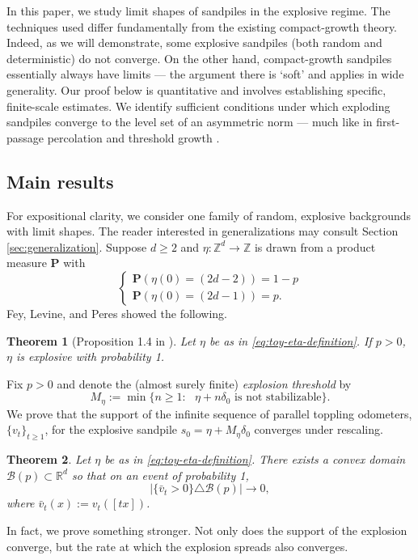 \documentclass[aap]{imsart}
\newcommand{\R}{\mathbb{R}}
\newcommand{\Z}{\mathbb{Z}}
\newtheorem{theorem}{Theorem}[section]
\begin{document}
In this paper, we study limit shapes of sandpiles in the explosive regime. The techniques used differ fundamentally from the existing compact-growth theory. Indeed, as we will demonstrate, some explosive sandpiles (both random and deterministic) do not converge. On the other hand, compact-growth sandpiles essentially always have limits --- the argument there is `soft' and applies in wide generality. Our proof below is quantitative and involves establishing specific, finite-scale estimates. We identify sufficient conditions under which exploding sandpiles converge to the level set of an asymmetric norm  --- much like in first-passage percolation  \cite{cox1981some} and threshold growth \cite{willson1978convergence, gravner1993threshold}.


\subsection{Main results}	
For expositional clarity, we consider one family of random, explosive backgrounds with limit shapes. The reader interested in generalizations may consult Section \ref{sec:generalization}. Suppose $d \geq 2$ and $\eta:\Z^d \to \Z$ is drawn from a product measure $\mathbf{P}$ with
\begin{equation} \label{eq:toy-eta-definition}
\begin{cases}
\mathbf{P}(\eta(0) = (2 d - 2)) = 1-p \\
\mathbf{P}(\eta(0) = (2 d - 1)) = p.
\end{cases}
\end{equation}
Fey, Levine, and Peres showed the following.
\begin{theorem}[Proposition 1.4 in \cite{fey2010growth}]\label{prop:fey_levine_peres_explode}
	Let $\eta$ be as in \eqref{eq:toy-eta-definition}.  If $p > 0$, $\eta$ is explosive with probability 1. 
\end{theorem}
Fix $p > 0$ and denote the (almost surely finite) {\it explosion threshold} by
\begin{equation} \label{eq:first_explosion}
M_{\eta} :=  \min\{ n \geq 1 : \mbox{ $\eta + n  \delta_0$ is not stabilizable} \}. 
\end{equation} 
We prove that the support of the infinite sequence of parallel toppling odometers, $\{v_t\}_{t \geq 1}$, for the explosive sandpile $s_0 = \eta + M_{\eta}  \delta_0$ converges under rescaling. 
\begin{theorem} \label{theorem:limit_shape}
	Let $\eta$ be as in \eqref{eq:toy-eta-definition}. 
	There exists a convex domain $\mathcal{B}(p) \subset \R^d$ so that on an event of 
	probability 1, 
	\[
	| \{ \bar{v}_t > 0\} \triangle \mathcal{B}(p)| \to 0, 
	\]
	where $\bar{v}_t(x) := v_t([t x])$. 
\end{theorem}
In fact, we prove something stronger. Not only does the support of the explosion converge, 
but the rate at which the explosion spreads also converges. 
\end{document}
